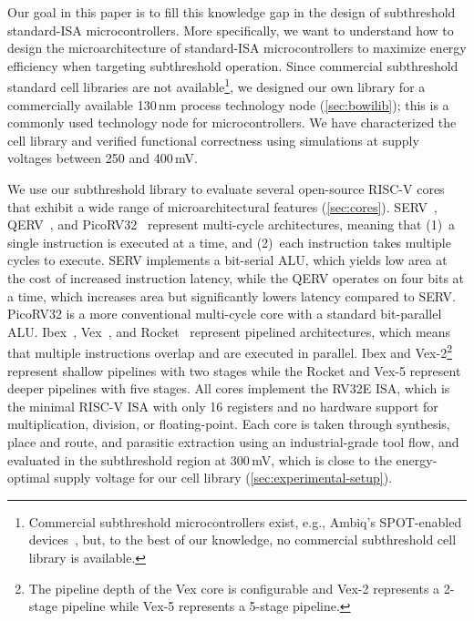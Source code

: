 Our goal in this paper is to fill this knowledge gap in the design of subthreshold standard-ISA microcontrollers.
More specifically, we want to understand how to design the microarchitecture of standard-ISA microcontrollers to maximize energy efficiency when targeting subthreshold operation.
Since commercial subthreshold standard cell libraries are not available\footnote{Commercial subthreshold microcontrollers exist, e.g., Ambiq's SPOT-enabled devices~\cite{ambiq-spot}, but, to the best of our knowledge, no commercial subthreshold cell library is available.}, we designed our own library for a commercially available 130\,nm process technology node (\autoref{sec:bowilib}); this is a commonly used technology node for microcontrollers.
We have characterized the cell library and verified functional correctness using simulations at supply voltages between 250 and 400\,mV.

We use our subthreshold library to evaluate several open-source RISC-V cores that exhibit a wide range of microarchitectural features (\autoref{sec:cores}).
SERV~\cite{serv:GITHUB}, QERV~\cite{serv:GITHUB}, and PicoRV32~\cite{picorv32:GITHUB} represent multi-cycle architectures, meaning that (1)~a single instruction is executed at a time, and (2)~each instruction takes multiple cycles to execute.
SERV implements a bit-serial ALU, which yields low area at the cost of increased instruction latency, while the QERV operates on four bits at a time, which increases area but significantly lowers latency compared to SERV.
PicoRV32 is a more conventional multi-cycle core with a standard bit-parallel ALU.
Ibex~\cite{ibex:GITHUB}, Vex~\cite{vexriscv:GITHUB}, and Rocket~\cite{rocket} represent pipelined architectures, which means that multiple instructions overlap and are executed in parallel.
Ibex and Vex-2\footnote{The pipeline depth of the Vex core is configurable and Vex-2 represents a 2-stage pipeline while Vex-5 represents a 5-stage pipeline.} represent shallow pipelines with two stages while the Rocket and Vex-5 represent deeper pipelines with five stages.
All cores implement the RV32E ISA, which is the minimal RISC-V ISA with only 16 registers and no hardware support for multiplication, division, or floating-point.
Each core is taken through synthesis, place and route, and parasitic extraction using an industrial-grade tool flow, 
and evaluated in the subthreshold region at 300\,mV, which is close to the energy-optimal supply voltage for our cell library (\autoref{sec:experimental-setup}).

